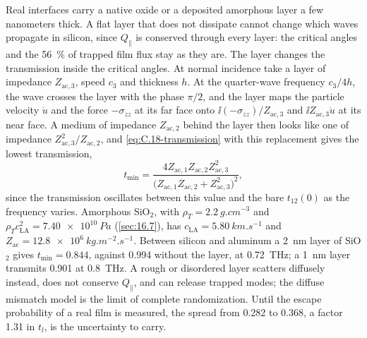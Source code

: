 Real interfaces carry a native oxide or a deposited amorphous layer a few nanometers thick. A flat layer that does not dissipate cannot change which waves propagate in silicon, since $Q_\parallel$ is conserved through every layer: the critical angles and the \SI{56}{\percent} of trapped film flux stay as they are. The layer changes the transmission inside the critical angles. At normal incidence take a layer of impedance $Z_{\mathrm{ac},3}$, speed $c_3$ and thickness $h$. At the quarter-wave frequency $c_3/4h$, the wave crosses the layer with the phase $\pi/2$, and the layer maps the particle velocity $\dot u$ and the force $-\sigma_{zz}$ at its far face onto $\ii(-\sigma_{zz})/Z_{\mathrm{ac},3}$ and $\ii Z_{\mathrm{ac},3}\dot u$ at its near face. A medium of impedance $Z_{\mathrm{ac},2}$ behind the layer then looks like one of impedance $Z_{\mathrm{ac},3}^2/Z_{\mathrm{ac},2}$, and \cref{eq:C.18-transmission} with this replacement gives the lowest transmission,
\begin{equation*}
  t_{\min} = \frac{4Z_{\mathrm{ac},1}Z_{\mathrm{ac},2}Z_{\mathrm{ac},3}^2}{\bigl(Z_{\mathrm{ac},1}Z_{\mathrm{ac},2} + Z_{\mathrm{ac},3}^2\bigr)^2} ,
\end{equation*}
since the transmission oscillates between this value and the bare $t_{12}(0)$ as the frequency varies. Amorphous SiO$_2$, with $\rho_T = \SI{2.2}{g.cm^{-3}}$ and $\rho_Tc_{\mathrm{LA}}^2 = \SI{7.40e10}{Pa}$ (\cref{sec:16.7}), has $c_{\mathrm{LA}} = \SI{5.80}{km.s^{-1}}$ and $Z_{\mathrm{ac}} = \SI{12.8e6}{kg.m^{-2}.s^{-1}}$. Between silicon and aluminum a \SI{2}{nm} layer of SiO$_2$ gives $t_{\min} = 0.844$, against 0.994 without the layer, at \SI{0.72}{THz}; a \SI{1}{nm} layer transmits 0.901 at \SI{0.8}{THz}. A rough or disordered layer scatters diffusely instead, does not conserve $Q_\parallel$, and can release trapped modes; the diffuse mismatch model is the limit of complete randomization. Until the escape probability of a real film is measured, the spread from 0.282 to 0.368, a factor 1.31 in $t_l$, is the uncertainty to carry.
